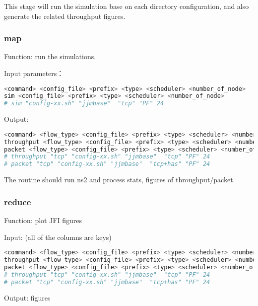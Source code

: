 This stage will run the simulation base on each directory configuration,
and also generate the related throughput figures.


\subsubsection{map}
Function: run the simulations.


Input parameters：
\begin{lstlisting}[language=bash]
<command> <config_file> <prefix> <type> <scheduler> <number_of_node>
sim <config_file> <prefix> <type> <scheduler> <number_of_node>
# sim "config-xx.sh" "jjmbase"  "tcp" "PF" 24
\end{lstlisting}


Output:
\begin{lstlisting}[language=bash]
<command> <flow_type> <config_file> <prefix> <type> <scheduler> <number_of_node>
throughput <flow_type> <config_file> <prefix> <type> <scheduler> <number_of_node>
packet <flow_type> <config_file> <prefix> <type> <scheduler> <number_of_node>
# throughput "tcp" "config-xx.sh" "jjmbase"  "tcp" "PF" 24
# packet "tcp" "config-xx.sh" "jjmbase"  "tcp+has" "PF" 24
\end{lstlisting}

The routine should run ns2 and process stats, figures of throughput/packet.




\subsubsection{reduce}
Function: plot JFI figures


Input: (all of the columns are keys)
\begin{lstlisting}[language=bash]
<command> <flow_type> <config_file> <prefix> <type> <scheduler> <number_of_node>
throughput <flow_type> <config_file> <prefix> <type> <scheduler> <number_of_node>
packet <flow_type> <config_file> <prefix> <type> <scheduler> <number_of_node>
# throughput "tcp" "config-xx.sh" "jjmbase"  "tcp" "PF" 24
# packet "tcp" "config-xx.sh" "jjmbase"  "tcp+has" "PF" 24
\end{lstlisting}

Output: figures

